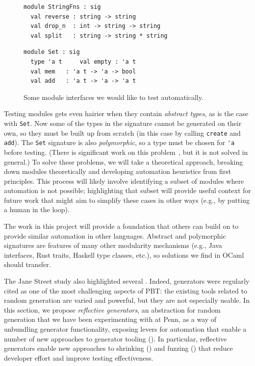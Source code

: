 \begin{figure}[h]
  \begin{minipage}{.45\textwidth}
\begin{lstlisting}
module StringFns : sig
  val reverse : string -> string
  val drop_n  : int -> string -> string
  val split   : string -> string * string
\end{lstlisting}
  \end{minipage}
  \qquad\qquad
  \begin{minipage}{.45\textwidth}
\begin{lstlisting}
module Set : sig
  type 'a t     val empty : 'a t
  val mem   : 'a t -> 'a -> bool
  val add   : 'a t -> 'a -> 'a t
\end{lstlisting}
  \end{minipage}
  \vspace{-2mm}
  \caption{Some module interfaces we would like to test
    automatically.}\label{fig:sigs}
\end{figure}

Testing modules gets even hairier when they contain {\em abstract types}, as is
the case with \lstinline{Set}. Now some of the types in the signature cannot be
generated on their own, so they must be built up from scratch (in this case by
calling \lstinline{create} and \lstinline{add}). The \lstinline{Set} signature is
also {\em polymorphic}, so a type must be chosen for \lstinline{'a} before
testing. (There is significant work on this
problem~\cite{hou_favonia_logarithm_2022}, but it is not solved in general.)
To solve these problems, we will take a theoretical approach, breaking down
modules theoretically and developing automation heuristics from first
principles. This process will likely involve identifying a subset of
modules where automation is not possible; highlighting that subset will
provide useful context for future work that might aim to simplify these cases in
other ways (e.g., by putting a human in the loop).

The work in this project will provide a foundation that others can build on to
provide similar automation in other languages. Abstract and polymorphic
signatures are features of many other modularity mechanisms (e.g., Java
interfaces, Rust traits, Haskell type classes, etc.), so solutions we find in
OCaml should transfer.

%
The Jane Street study also highlighted several .
Indeed, generators were regularly cited as one of the most challenging
aspects of PBT: the existing tools related to random generation are varied
and powerful, but
they are not especially usable.  In this section, we propose {\em reflective
generators}, an abstraction for random generation that we have been
experimenting with at Penn, as a way of unbundling generator
functionality, exposing levers for
automation that enable a number of new approaches to generator
tooling (). In particular, reflective
generators enable new
approaches to shrinking () and fuzzing
() that reduce developer effort and improve testing
effectiveness.

